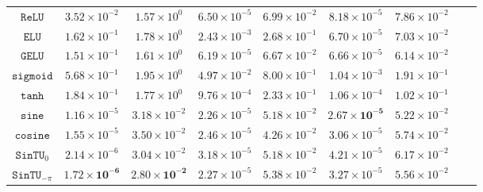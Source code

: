 \documentclass[11pt,a4paper]{article}
\begin{document}
\begin{table}[ht]
{\begin{tabular}{ccccccccc}
$\mathtt{ReLU}$ &  $ 3.52 \times 10^{-2} $  &  $ 1.57 \times 10^{0} $  &  $ 6.50 \times 10^{-5} $  &  $ 6.99 \times 10^{-2} $  &  $ 8.18 \times 10^{-5} $  &  $ 7.86 \times 10^{-2} $ 
 \\ 

\rowcolor{mygray}$\mathtt{ELU}$ &  $ 1.62 \times 10^{-1} $  &  $ 1.78 \times 10^{0} $  &  $ 2.43 \times 10^{-3} $  &  $ 2.68 \times 10^{-1} $  &  $ 6.70 \times 10^{-5} $  &  $ 7.03 \times 10^{-2} $ 
 \\ 

 $\mathtt{GELU}$ &  $ 1.51 \times 10^{-1} $  &  $ 1.61 \times 10^{0} $  &  $ 6.19 \times 10^{-5} $  &  $ 6.67 \times 10^{-2} $  &  $ 6.66 \times 10^{-5} $  &  $ 6.14 \times 10^{-2} $ 
 \\ 

\rowcolor{mygray}$\mathtt{sigmoid}$ &  $ 5.68 \times 10^{-1} $  &  $ 1.95 \times 10^{0} $  &  $ 4.97 \times 10^{-2} $  &  $ 8.00 \times 10^{-1} $  &  $ 1.04 \times 10^{-3} $  &  $ 1.91 \times 10^{-1} $ 
 \\ 

 $\mathtt{tanh}$ &  $ 1.84 \times 10^{-1} $  &  $ 1.77 \times 10^{0} $  &  $ 9.76 \times 10^{-4} $  &  $ 2.33 \times 10^{-1} $  &  $ 1.06 \times 10^{-4} $  &  $ 1.02 \times 10^{-1} $ 
 \\ 

\rowcolor{mygray}$\mathtt{sine}$ &  $ 1.16 \times 10^{-5} $  &  $ 3.18 \times 10^{-2} $  &  $ 2.26 \times 10^{-5} $  &  $ 5.18 \times 10^{-2} $  &  $ \bm{2.67 \times 10^{-5}} $  &  $ 5.22 \times 10^{-2} $ 
 \\ 

 $\mathtt{cosine}$ &  $ 1.55 \times 10^{-5} $  &  $ 3.50 \times 10^{-2} $  &  $ 2.46 \times 10^{-5} $  &  $ 4.26 \times 10^{-2} $  &  $ 3.06 \times 10^{-5} $  &  $ 5.74 \times 10^{-2} $ 
 \\ 


 $\mathtt{SinTU}_{0}$ &  $ 2.14 \times 10^{-6} $  &  $ 3.04 \times 10^{-2} $  &  $ 3.18 \times 10^{-5} $  &  $ 5.18 \times 10^{-2} $  &  $ 4.21 \times 10^{-5} $  &  $ 6.17 \times 10^{-2} $ 
 \\ 

\rowcolor{mygray}$\mathtt{SinTU}_{-\pi}$ &  $ \bm{1.72 \times 10^{-6} } $  &  $ \bm{2.80 \times 10^{-2}} $  &  $ 2.27 \times 10^{-5} $  &  $ 5.38 \times 10^{-2} $  &  $ 3.27 \times 10^{-5} $  &  $ 5.56 \times 10^{-2} $ 
 \\ 


\end{tabular}}
\end{table}
\end{document}

